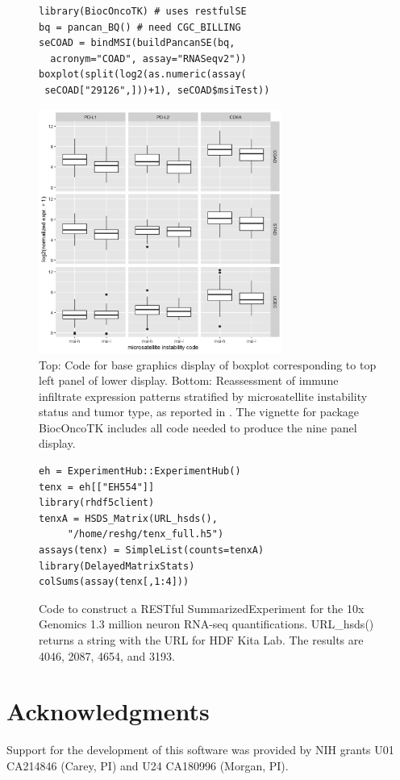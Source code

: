 \documentclass[applications]{gen-bioinformatics}
\begin{document}
\begin{figure}[bb]
\begin{verbatim}
library(BiocOncoTK) # uses restfulSE
bq = pancan_BQ() # need CGC_BILLING
seCOAD = bindMSI(buildPancanSE(bq, 
  acronym="COAD", assay="RNASeqv2"))
boxplot(split(log2(as.numeric(assay(
 seCOAD["29126",]))+1), seCOAD$msiTest))
\end{verbatim}
\includegraphics[height=8.0cm]{imm3x3.png}
\caption{Top: Code for base graphics display of boxplot
corresponding to top left panel of lower display.
Bottom: Reassessment of immune infiltrate expression
patterns stratified by microsatellite instability
status and tumor type, as reported in \cite{Bailey2018}.
The vignette for package BiocOncoTK includes all
code needed to produce the nine panel display.}
\label{pancanPanel}
\end{figure}

\begin{figure}[bb]
\begin{verbatim}
eh = ExperimentHub::ExperimentHub()
tenx = eh[["EH554"]]
library(rhdf5client)
tenxA = HSDS_Matrix(URL_hsds(), 
     "/home/reshg/tenx_full.h5") 
assays(tenx) = SimpleList(counts=tenxA)
library(DelayedMatrixStats)
colSums(assay(tenx[,1:4]))
\end{verbatim}
\caption{Code to construct a RESTful SummarizedExperiment
for the 10x Genomics 1.3 million neuron RNA-seq quantifications.
URL\_hsds() returns a string with 
the URL for HDF Kita Lab.  The results are
4046, 2087, 4654, and 3193.}
\label{hdffig}
\end{figure}

\section*{Acknowledgments}
Support for the development of this software was provided by NIH grants
U01 CA214846 (Carey, PI) and U24 CA180996 (Morgan, PI).


\end{document}
